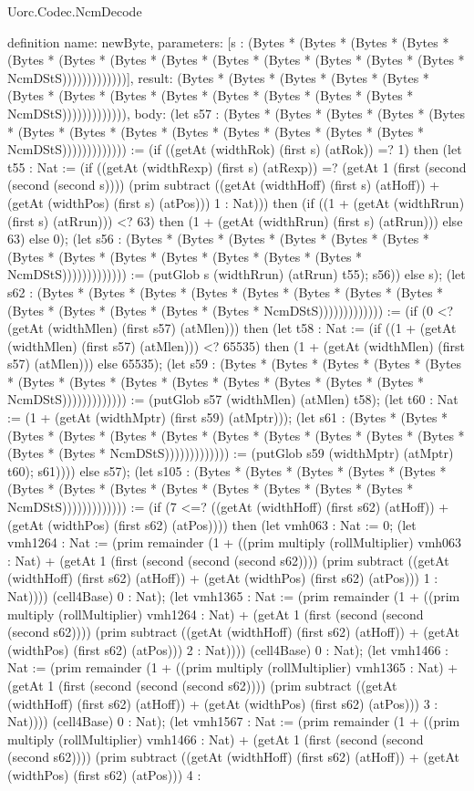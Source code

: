 \begin{lexlean}{Uorc.Codec.NcmDecode}
\begin{semanticmodule}
definition{
  name: newByte,
  parameters: [s : (Bytes * (Bytes * (Bytes * (Bytes * (Bytes * (Bytes * (Bytes * (Bytes * (Bytes * (Bytes * (Bytes * (Bytes * (Bytes * NcmDStS)))))))))))))],
  result: (Bytes * (Bytes * (Bytes * (Bytes * (Bytes * (Bytes * (Bytes * (Bytes * (Bytes * (Bytes * (Bytes * (Bytes * (Bytes * NcmDStS))))))))))))),
  body: (let s57 : (Bytes * (Bytes * (Bytes * (Bytes * (Bytes * (Bytes * (Bytes * (Bytes * (Bytes * (Bytes * (Bytes * (Bytes * (Bytes * NcmDStS))))))))))))) := (if ((getAt (widthRok) (first s) (atRok)) =? 1) then (let t55 : Nat := (if ((getAt (widthRexp) (first s) (atRexp)) =? (getAt 1 (first (second (second (second s)))) (prim subtract ((getAt (widthHoff) (first s) (atHoff)) + (getAt (widthPos) (first s) (atPos))) 1 : Nat))) then (if ((1 + (getAt (widthRrun) (first s) (atRrun))) <? 63) then (1 + (getAt (widthRrun) (first s) (atRrun))) else 63) else 0); (let s56 : (Bytes * (Bytes * (Bytes * (Bytes * (Bytes * (Bytes * (Bytes * (Bytes * (Bytes * (Bytes * (Bytes * (Bytes * (Bytes * NcmDStS))))))))))))) := (putGlob s (widthRrun) (atRrun) t55); s56)) else s); (let s62 : (Bytes * (Bytes * (Bytes * (Bytes * (Bytes * (Bytes * (Bytes * (Bytes * (Bytes * (Bytes * (Bytes * (Bytes * (Bytes * NcmDStS))))))))))))) := (if (0 <? (getAt (widthMlen) (first s57) (atMlen))) then (let t58 : Nat := (if ((1 + (getAt (widthMlen) (first s57) (atMlen))) <? 65535) then (1 + (getAt (widthMlen) (first s57) (atMlen))) else 65535); (let s59 : (Bytes * (Bytes * (Bytes * (Bytes * (Bytes * (Bytes * (Bytes * (Bytes * (Bytes * (Bytes * (Bytes * (Bytes * (Bytes * NcmDStS))))))))))))) := (putGlob s57 (widthMlen) (atMlen) t58); (let t60 : Nat := (1 + (getAt (widthMptr) (first s59) (atMptr))); (let s61 : (Bytes * (Bytes * (Bytes * (Bytes * (Bytes * (Bytes * (Bytes * (Bytes * (Bytes * (Bytes * (Bytes * (Bytes * (Bytes * NcmDStS))))))))))))) := (putGlob s59 (widthMptr) (atMptr) t60); s61)))) else s57); (let s105 : (Bytes * (Bytes * (Bytes * (Bytes * (Bytes * (Bytes * (Bytes * (Bytes * (Bytes * (Bytes * (Bytes * (Bytes * (Bytes * NcmDStS))))))))))))) := (if (7 <=? ((getAt (widthHoff) (first s62) (atHoff)) + (getAt (widthPos) (first s62) (atPos)))) then (let vmh063 : Nat := 0; (let vmh1264 : Nat := (prim remainder (1 + ((prim multiply (rollMultiplier) vmh063 : Nat) + (getAt 1 (first (second (second (second s62)))) (prim subtract ((getAt (widthHoff) (first s62) (atHoff)) + (getAt (widthPos) (first s62) (atPos))) 1 : Nat)))) (cell4Base) 0 : Nat); (let vmh1365 : Nat := (prim remainder (1 + ((prim multiply (rollMultiplier) vmh1264 : Nat) + (getAt 1 (first (second (second (second s62)))) (prim subtract ((getAt (widthHoff) (first s62) (atHoff)) + (getAt (widthPos) (first s62) (atPos))) 2 : Nat)))) (cell4Base) 0 : Nat); (let vmh1466 : Nat := (prim remainder (1 + ((prim multiply (rollMultiplier) vmh1365 : Nat) + (getAt 1 (first (second (second (second s62)))) (prim subtract ((getAt (widthHoff) (first s62) (atHoff)) + (getAt (widthPos) (first s62) (atPos))) 3 : Nat)))) (cell4Base) 0 : Nat); (let vmh1567 : Nat := (prim remainder (1 + ((prim multiply (rollMultiplier) vmh1466 : Nat) + (getAt 1 (first (second (second (second s62)))) (prim subtract ((getAt (widthHoff) (first s62) (atHoff)) + (getAt (widthPos) (first s62) (atPos))) 4 : }
\end{semanticmodule}
\end{lexlean}
